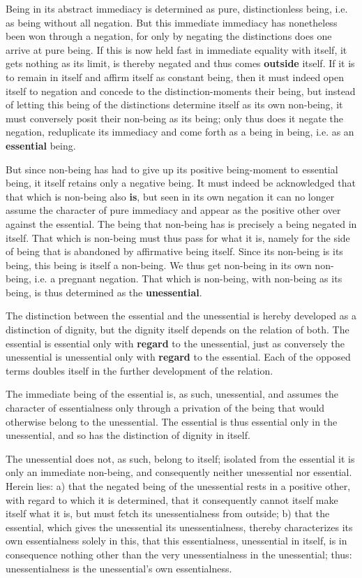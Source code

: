 \documentclass[12pt,a4paper,openany]{book}
\newcommand{\opage}[1]{\marginnote{\footnotesize\textit{[#1]}}}
\begin{document}
Being in its abstract immediacy is determined as pure, distinctionless being, i.e. as being without all negation. But this immediate immediacy has nonetheless been won through a negation, for only by negating the distinctions does one arrive at pure being. If this is now held fast in immediate equality with itself, it gets nothing as its limit, is thereby negated and thus comes \textbf{outside} itself. If it is to remain in itself and affirm itself as constant being, then it must indeed open itself to negation and concede to the distinction-moments their being, but instead of letting this being of the distinctions determine itself as its own non-being, it must conversely posit their non-being as its being; only thus does it negate the negation, reduplicate its immediacy and come forth as a being in being, i.e. as an \textbf{essential} being.

But since non-being has had to give up its positive being-moment to essential being, it itself retains only a negative being. It must indeed be acknowledged that that which is non-being also \textbf{is}, but seen in its
\setcounter{footnote}{0}%
\opage{84}own negation it can no longer assume the character of pure immediacy and appear as the positive other over against the essential. The being that non-being has is precisely a being negated in itself. That which is non-being must thus pass for what it is, namely for the side of being that is abandoned by affirmative being itself. Since its non-being is its being, this being is itself a non-being. We thus get non-being in its own non-being, i.e. a pregnant negation. That which is non-being, with non-being as its being, is thus determined as the \textbf{unessential}.

The distinction between the essential and the unessential is hereby developed as a distinction of dignity, but the dignity itself depends on the relation of both. The essential is essential only with \textbf{regard} to the unessential, just as conversely the unessential is unessential only with \textbf{regard} to the essential. Each of the opposed terms doubles itself in the further development of the relation.

The immediate being of the essential is, as such, unessential, and assumes the character of essentialness only through a privation of the being that would otherwise belong to the unessential. The essential is thus essential only in the unessential, and so has the distinction of dignity in itself.

The unessential does not, as such, belong to itself; isolated from the essential it is only an immediate non-being, and consequently neither unessential nor essential. Herein lies: a) that the negated being of the unessential rests in a positive other, with regard to which it is determined, that it consequently cannot itself make itself what it is, but must fetch its unessentialness from outside; b) that the essential, which gives the unessential its unessentialness, thereby characterizes its
\setcounter{footnote}{0}%
\opage{85}own essentialness solely in this, that this essentialness, unessential in itself, is in consequence nothing other than the very unessentialness in the unessential; thus: unessentialness is the unessential's own essentialness.
\end{document}
